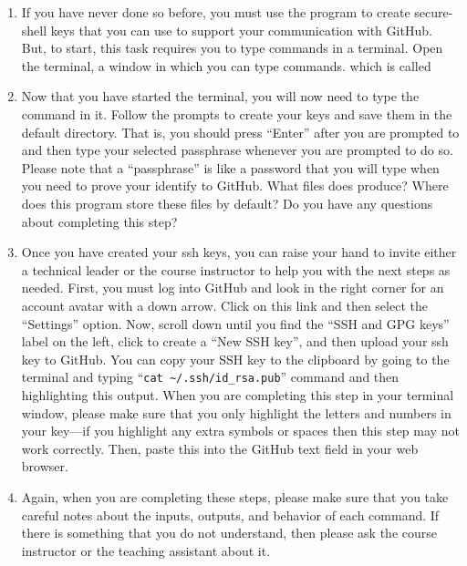 \begin{enumerate}

  \item If you have never done so before, you must use the  program to create secure-shell keys that
    you can use to support your communication with GitHub. But, to start, this task requires you to type commands in a terminal. Open the terminal, a window in which you can type commands. which is called 

  \item Now that you have started the terminal, you will now need to type the \\
   command in it. Follow
    the prompts to create your keys and save them in the default directory. That is, you should press ``Enter'' after
    you are prompted to  and then type your selected passphrase
    whenever you are prompted to do so. Please note that a ``passphrase'' is like a password that you will type when you
    need to prove your identify to GitHub. What files does  produce? Where does this program store
    these files by default? Do you have any questions about completing this step?

  \item Once you have created your ssh keys, you can raise your hand to invite either a technical leader or the
    course instructor to help you with the next steps as needed. First, you must log into GitHub and look in the right corner for
    an account avatar with a down arrow. Click on this link and then select the ``Settings'' option. Now, scroll down
    until you find the ``SSH and GPG keys'' label on the left, click to create a ``New SSH key'', and then upload your
    ssh key to GitHub. You can copy your SSH key to the clipboard by going to the terminal and typing ``{\tt cat
    \textasciitilde{}/.ssh/id\_rsa.pub}'' command and then highlighting this output. When you are completing this step
    in your terminal window, please make sure that you only highlight the letters and numbers in your key---if you
    highlight any extra symbols or spaces then this step may not work correctly. Then, paste this into the GitHub text
    field in your web browser.

  \item Again, when you are completing these steps, please make sure that you take careful notes about the inputs,
    outputs, and behavior of each command. If there is something that you do not understand, then please ask the course
    instructor or the teaching assistant about it.

\end{enumerate}


